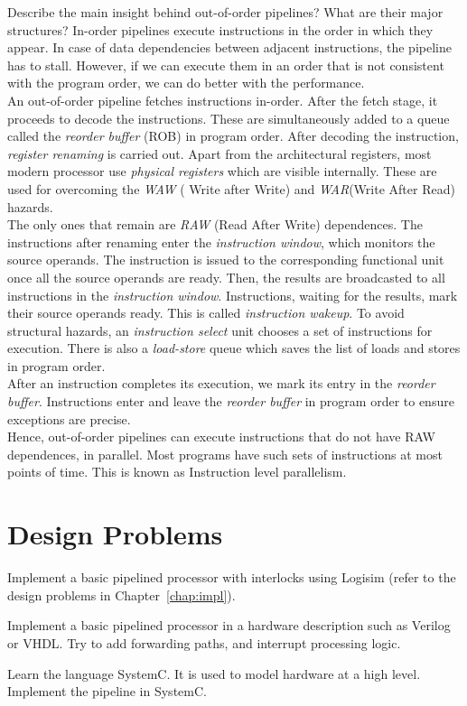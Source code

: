 \begin{ExerciseList}
\Exercise
Describe the main insight behind out-of-order pipelines? What are their major structures?
\Answer
In-order pipelines execute instructions in the order in which they appear. In case of data dependencies between adjacent instructions, the pipeline has to stall. However, if we can execute them in an order that is not consistent with the program order, we can do better with the performance. \\
An out-of-order pipeline fetches instructions in-order. After the fetch stage, it proceeds to decode the instructions. These are simultaneously added to a queue called the \textit{reorder buffer} (ROB) in program order. After decoding the instruction, \textit{register renaming} is carried out. Apart from the architectural registers, most modern processor use \textit{physical registers} which are visible internally. These are used for overcoming the \textit{WAW} ( Write after Write) and \textit{WAR}(Write After Read) hazards. \\
The only ones that remain are \textit{RAW} (Read After Write) dependences. The instructions after renaming enter the \textit{instruction window}, which monitors the source operands. The instruction is issued to the corresponding functional unit once all the source operands are ready. Then, the results are broadcasted to all instructions in the \textit{instruction window}. Instructions, waiting for the results, mark their source operands ready. This is called \textit{instruction wakeup}. To avoid structural hazards, an \textit{instruction select} unit chooses a set of instructions for execution. There is also a \textit{load-store} queue which saves the list of loads and stores in program order. \\
After an instruction completes its execution, we mark its entry in the \textit{reorder buffer}. Instructions enter and leave the \textit{reorder buffer} in program order to ensure exceptions are precise. \\
Hence, out-of-order pipelines can execute instructions that do not have RAW dependences, in parallel. Most programs have such sets of instructions at most points of time. This is known as Instruction level parallelism.\\  
\end{ExerciseList}

\section*{Design Problems}

\begin{ExerciseList}
\Exercise
Implement a basic pipelined processor with interlocks using Logisim (refer to the design problems
in Chapter~\ref{chap:impl}).

\Exercise
Implement a basic pipelined processor in a hardware description such as Verilog or VHDL. Try to
add forwarding paths, and interrupt processing logic.

\Exercise
Learn the language SystemC. It is used to model hardware at a high level. Implement the \simplerisc
pipeline in SystemC. 

\end{ExerciseList}
